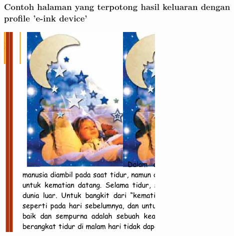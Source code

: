 \documentclass[11pt]{beamer}
\begin{document}
 
\begin{frame}[shrink=20]
\frametitle{Contoh halaman yang terpotong hasil keluaran dengan profile 'e-ink device'}
\includegraphics[width=\paperwidth]{graphic/eink_output.png}
\end{frame}
\end{document}
